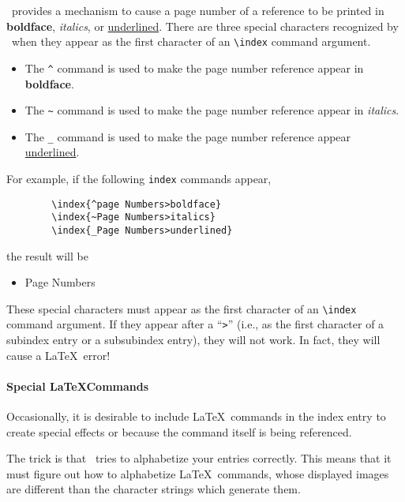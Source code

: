 \IdxTeX\ provides a mechanism to cause a page number of a reference to be
printed in {\bf boldface}, {\em italics}, or \underline{underlined}.  There
are three special characters recognized by \IdxTeX\  when they appear as the
first character of an \verb~\index~ command argument.

\begin{itemize}
\item The \verb~^~ command is 
used to make the page number reference appear in {\bf boldface}. 
\item The \verb!~! command is 
used to make the page number reference appear in {\em italics}.
\item The {\tt\_} command is used to
make the page number reference appear \underline{underlined}. 
\end{itemize}

For example, if the following \verb~index~ commands appear,
\begin{verbatim}
        \index{^page Numbers>boldface}
        \index{~Page Numbers>italics}
        \index{_Page Numbers>underlined}
\end{verbatim}
the result will be
\begin{itemize}
\item{Page Numbers}
\end{itemize}

These special characters must appear as the first character of an \verb~\index~
command argument.  If they appear after a ``\verb~>~'' (i.e., as the first
character of a subindex entry or a subsubindex entry), they will not work. In
fact, they will cause a \LaTeX\ error!

\paragraph{Special   \LaTeX   Commands}
Occasionally, it is desirable to include \LaTeX\
commands in the index entry to create special effects or because
the command itself is being referenced.  

The trick is that \IdxTeX\ tries to alphabetize your entries correctly.  This
means that it must figure out how to alphabetize \LaTeX\ commands, whose 
displayed images are different than the character strings which generate them.

